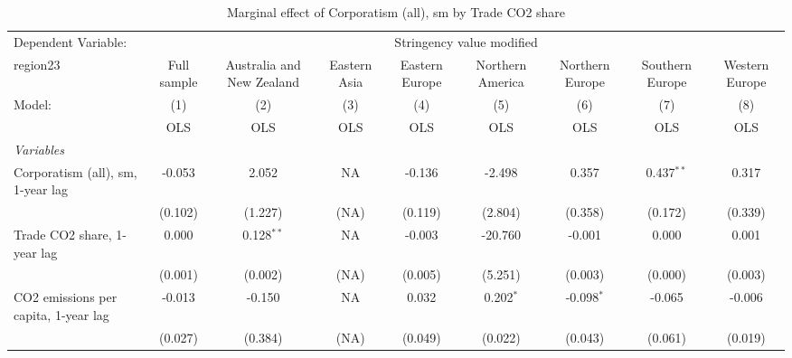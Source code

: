 
\begin{table}[htbp]
   \caption{Marginal effect of Corporatism (all), sm by Trade CO2 share}
   \centering
   \begin{tabular}{lcccccccc}
      \toprule
      Dependent Variable: & \multicolumn{8}{c}{Stringency value modified}\\
      region23                                                        & Full sample   & Australia and New Zealand & Eastern Asia & Eastern Europe & Northern America & Northern Europe & Southern Europe & Western Europe \\   
      Model:                                                          & (1)           & (2)                       & (3)          & (4)            & (5)              & (6)             & (7)             & (8)\\  
                                                                      &  OLS          & OLS                       & OLS          & OLS            & OLS              & OLS             & OLS             & OLS\\  
      \midrule
      \emph{Variables}\\
      Corporatism (all), sm, 1-year lag                               & -0.053        & 2.052                     & NA           & -0.136         & -2.498           & 0.357           & 0.437$^{**}$    & 0.317\\   
                                                                      & (0.102)       & (1.227)                   & (NA)         & (0.119)        & (2.804)          & (0.358)         & (0.172)         & (0.339)\\   
      Trade CO2 share, 1-year lag                                     & 0.000         & 0.128$^{**}$              & NA           & -0.003         & -20.760          & -0.001          & 0.000           & 0.001\\   
                                                                      & (0.001)       & (0.002)                   & (NA)         & (0.005)        & (5.251)          & (0.003)         & (0.000)         & (0.003)\\   
      CO2 emissions per capita, 1-year lag                            & -0.013        & -0.150                    & NA           & 0.032          & 0.202$^{*}$      & -0.098$^{*}$    & -0.065          & -0.006\\   
                                                                      & (0.027)       & (0.384)                   & (NA)         & (0.049)        & (0.022)          & (0.043)         & (0.061)         & (0.019)\\   

\end{tabular}
\end{table}
